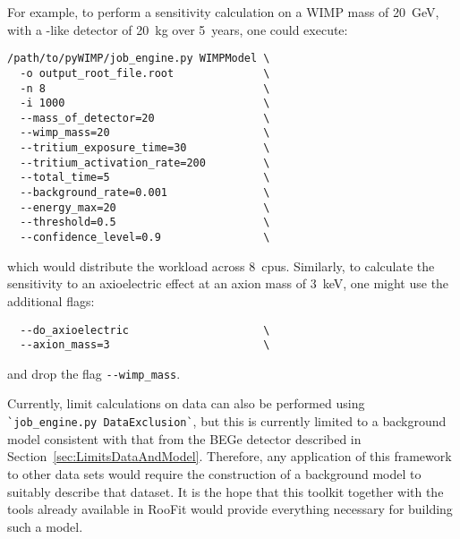 For example, to perform a sensitivity calculation on a WIMP mass of 20~GeV, with a \MJ-like detector
of 20~kg over 5~years, one could execute:
				\begin{lstlisting}
/path/to/pyWIMP/job_engine.py WIMPModel	\
  -o output_root_file.root 				\
  -n 8 									\
  -i 1000 								\
  --mass_of_detector=20 				\
  --wimp_mass=20 						\
  --tritium_exposure_time=30			\
  --tritium_activation_rate=200			\
  --total_time=5 						\
  --background_rate=0.001 				\
  --energy_max=20 						\
  --threshold=0.5 						\ 
  --confidence_level=0.9 				\
				\end{lstlisting}
which would distribute the workload across 8~cpus.  Similarly, to calculate the sensitivity to an axioelectric effect at an axion
mass of 3~keV, one might use the additional flags:
				\begin{lstlisting}
  --do_axioelectric						\
  --axion_mass=3 						\
				\end{lstlisting}
and drop the flag \lstinline!--wimp_mass!.  

Currently, limit calculations on data can also be performed using \lstinline!`job_engine.py DataExclusion`!, but this is currently limited
to a background model consistent with that from the BEGe detector described in Section~\ref{sec:LimitsDataAndModel}.  Therefore, any application of this framework to other data sets would require the construction of a background model to suitably 
describe that dataset.  It is the hope that this toolkit together with the tools already available in RooFit would provide
everything necessary for building such a model.
